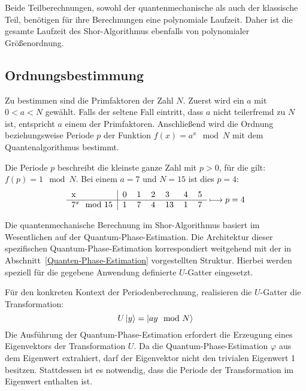 Beide Teilberechnungen, sowohl der quantenmechanische als auch der klassische Teil, 
benötigen für ihre Berechnungen eine polynomiale Laufzeit. 
Daher ist die gesamte Laufzeit des Shor-Algorithmus ebenfalls von polynomialer Größenordnung.

\subsection{Ordnungsbestimmung} \label{Shor:Ordnungsbestimmung}
Zu bestimmen sind die Primfaktoren der Zahl \(N\).
Zuerst wird ein \(a\) mit \(0 < a < N\) gewählt.
Falls der seltene Fall eintritt, dass \(a\) nicht teilerfremd zu \(N\) ist, entspricht \(a\) einem der Primfaktoren.
Anschließend wird die Ordnung beziehungsweise Periode \(p\) der Funktion \({f(x) = a^x \mod N}\) mit dem Quantenalgorithmus bestimmt.

Die Periode \(p\) beschreibt die kleinste ganze Zahl mit \({p > 0}\), für die gilt: \({f(p) = 1 \mod N}\).
Bei einem \(a = 7\) und \(N = 15\) ist dies \(p=4\):
\[
\begin{tabular}{l|llllll}
    x     &     0     &     1       &     2      &      3   &  4 &  5  \\ \hline
    \(7^x \mod 15\)    &      1     &        7     &       4     &     13     &  1 &  7 
\end{tabular} \longmapsto p = 4
\]

Die quantenmechanische Berechnung im Shor-Algorithmus basiert im Wesentlichen auf der Quantum-Phase-Estimation.
Die Architektur dieser spezifischen Quantum-Phase-Estimation korrespondiert weitgehend mit der in Abschnitt~\ref{Quanten-Phase-Estimation} vorgestellten Struktur.
Hierbei werden speziell für die gegebene Anwendung definierte \(U\)-Gatter eingesetzt.

Für den konkreten Kontext der Periodenberechnung, realisieren die \(U\)-Gatter die Transformation:
\[U\ket{y} = \ket{ay \mod N}\] 
Die Ausführung der Quantum-Phase-Estimation erfordert die Erzeugung eines Eigenvektors der Transformation \(U\).
Da die Quantum-Phase-Estimation \(\varphi\) aus dem Eigenwert extrahiert, 
darf der Eigenvektor nicht den trivialen Eigenwert 1 besitzen.
Stattdessen ist es notwendig, dass die Periode der Transformation im Eigenwert enthalten ist.

